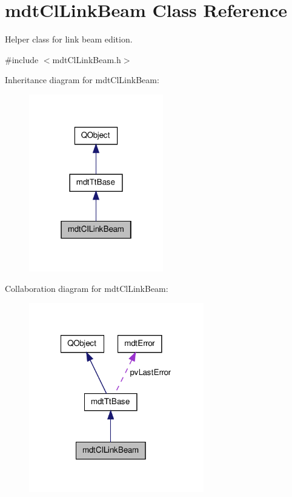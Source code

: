 \hypertarget{classmdt_cl_link_beam}{\section{mdt\-Cl\-Link\-Beam Class Reference}
\label{classmdt_cl_link_beam}
}


Helper class for link beam edition.  




{\ttfamily \#include $<$mdt\-Cl\-Link\-Beam.\-h$>$}



Inheritance diagram for mdt\-Cl\-Link\-Beam\-:
\nopagebreak
\begin{figure}[H]
\begin{center}
\leavevmode
\includegraphics[width=166pt]{classmdt_cl_link_beam__inherit__graph}
\end{center}
\end{figure}


Collaboration diagram for mdt\-Cl\-Link\-Beam\-:
\nopagebreak
\begin{figure}[H]
\begin{center}
\leavevmode
\includegraphics[width=216pt]{classmdt_cl_link_beam__coll__graph}
\end{center}
\end{figure}
